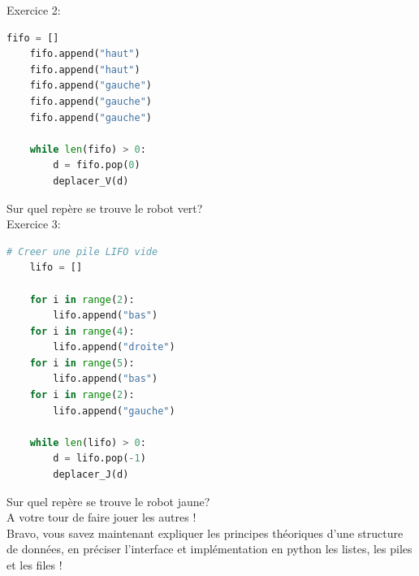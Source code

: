 Exercice 2:
\begin{lstlisting}[language=Python]
    fifo = []
    fifo.append("haut")
    fifo.append("haut")
    fifo.append("gauche")
    fifo.append("gauche")
    fifo.append("gauche")

    while len(fifo) > 0:
        d = fifo.pop(0)
        deplacer_V(d)
\end{lstlisting}
Sur quel repère se trouve le robot vert?\\

Exercice 3:
\begin{lstlisting}[language=Python]
    # Creer une pile LIFO vide 
    lifo = []

    for i in range(2):
        lifo.append("bas")
    for i in range(4):
        lifo.append("droite")
    for i in range(5):
        lifo.append("bas")
    for i in range(2):
        lifo.append("gauche")

    while len(lifo) > 0:
        d = lifo.pop(-1)
        deplacer_J(d)
\end{lstlisting}
Sur quel repère se trouve le robot jaune?\\

A votre tour de faire jouer les autres !\\




Bravo, vous savez maintenant expliquer les principes théoriques d'une structure de données, en préciser l'interface et implémentation en python les listes, les piles et les files ! 
